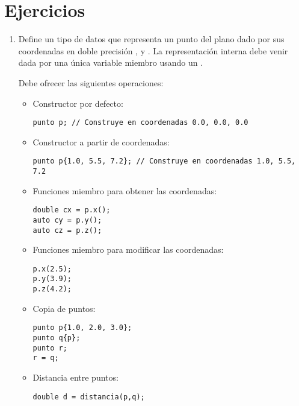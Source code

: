 \section{Ejercicios}

\begin{enumerate}

\item
Define un tipo de datos  que representa un punto del plano dado por
sus coordenadas en doble precisión ,  y . La
representación interna debe venir dada por una única variable miembro
 usando un .

Debe ofrecer las siguientes operaciones:

\begin{itemize}

\item Constructor por defecto:
\begin{lstlisting}
punto p; // Construye en coordenadas 0.0, 0.0, 0.0
\end{lstlisting}

\item Constructor a partir de coordenadas:
\begin{lstlisting}
punto p{1.0, 5.5, 7.2}; // Construye en coordenadas 1.0, 5.5, 7.2
\end{lstlisting}

\item Funciones miembro para obtener las coordenadas:
\begin{lstlisting}
double cx = p.x();
auto cy = p.y();
auto cz = p.z();
\end{lstlisting}

\item Funciones miembro para modificar las coordenadas:
\begin{lstlisting}
p.x(2.5);
p.y(3.9);
p.z(4.2);
\end{lstlisting}

\item Copia de puntos:
\begin{lstlisting}
punto p{1.0, 2.0, 3.0};
punto q{p};
punto r;
r = q;
\end{lstlisting}

\item Distancia entre puntos:
\begin{lstlisting}
double d = distancia(p,q);
\end{lstlisting}

\end{itemize}
\end{enumerate}
